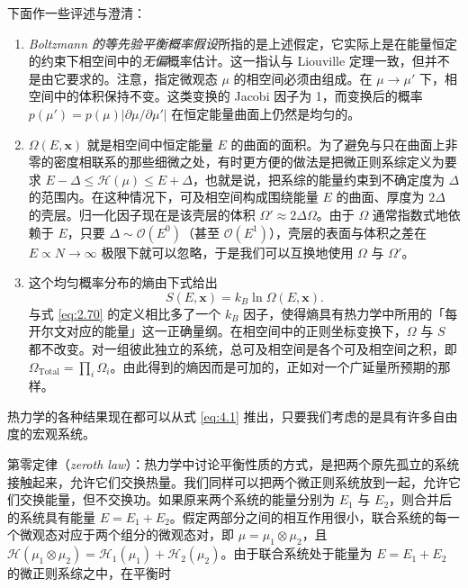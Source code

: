 下面作一些评述与澄清：

\begin{enumerate}[itemsep=0.35em,topsep=0.4em]
  \item \emph{Boltzmann 的等先验平衡概率假设}所指的是上述假定，它实际上是在能量恒定的约束下相空间中的\emph{无偏}概率估计。这一指认与 Liouville 定理一致，但并不是由它要求的。注意，指定微观态 $\mu$ 的相空间必须由组成。在 $\mu\to\mu'$ 下，相空间中的体积保持不变。这类变换的 Jacobi 因子为 1，而变换后的概率 $p(\mu')=p(\mu)|\partial\mu/\partial\mu'|$ 在恒定能量曲面上仍然是均匀的。

  \item {} $\Omega(E,\mathbf x)$ 就是相空间中恒定能量 $E$ 的曲面的面积。为了避免与只在曲面上非零的密度相联系的那些细微之处，有时更方便的做法是把微正则系综定义为要求 $E-\Delta\le\mathscr H(\mu)\le E+\Delta$，也就是说，把系综的能量约束到不确定度为 $\Delta$ 的范围内。在这种情况下，可及相空间构成围绕能量 $E$ 的曲面、厚度为 $2\Delta$ 的壳层。归一化因子现在是该壳层的体积 $\Omega'\approx2\Delta\Omega$。由于 $\Omega$ 通常指数式地依赖于 $E$，只要 $\Delta\sim\mathcal{O}(E^0)$（甚至 $\mathcal{O}(E^1)$），壳层的表面与体积之差在 $E\propto N\to\infty$ 极限下就可以忽略，于是我们可以互换地使用 $\Omega$ 与 $\Omega'$。

  \item 这个均匀概率分布的熵由下式给出
  \begin{equation}\label{eq:4.2}
    S(E,\mathbf x)=k_B\ln\Omega(E,\mathbf x).
  \end{equation}
  与式 \eqref{eq:2.70} 的定义相比多了一个 $k_B$ 因子，使得熵具有热力学中所用的「每开尔文对应的能量」这一正确量纲。在相空间中的正则坐标变换下，$\Omega$ 与 $S$ 都不改变。对一组彼此独立的系统，总可及相空间是各个可及相空间之积，即 $\Omega_{\text{Total}}=\prod_i\Omega_i$。由此得到的熵因而是可加的，正如对一个广延量所预期的那样。
\end{enumerate}

热力学的各种结果现在都可以从式 \eqref{eq:4.1} 推出，只要我们考虑的是具有许多自由度的宏观系统。


第零定律（\textit{zeroth law}）：热力学中讨论平衡性质的方式，是把两个原先孤立的系统接触起来，允许它们交换热量。我们同样可以把两个微正则系统放到一起，允许它们交换能量，但不交换功。如果原来两个系统的能量分别为 $E_1$ 与 $E_2$，则合并后的系统具有能量 $E=E_1+E_2$。假定两部分之间的相互作用很小，联合系统的每一个微观态对应于两个组分的微观态对，即 $\mu=\mu_1\otimes\mu_2$，且 $\mathscr H(\mu_1\otimes\mu_2)=\mathscr H_1(\mu_1)+\mathscr H_2(\mu_2)$。由于联合系统处于能量为 $E=E_1+E_2$ 的微正则系综之中，在平衡时

